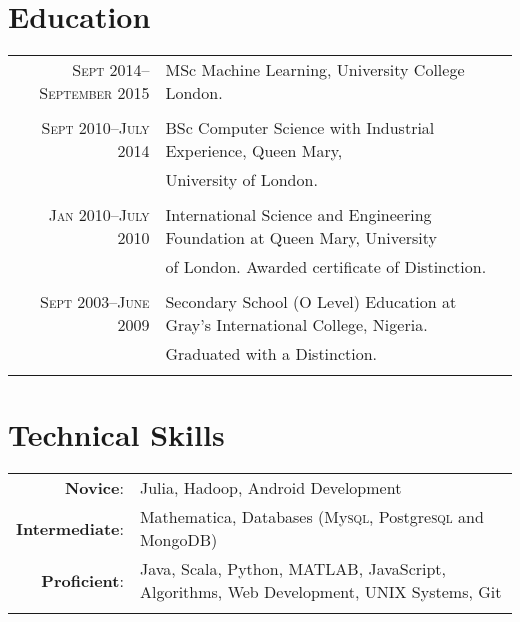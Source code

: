 \documentclass[a4paper,10pt]{article}
\begin{document}
\section{Education}
\begin{tabular}{rl}
  \textsc{Sept} 2014--\textsc{September} 2015 & MSc Machine Learning, University College London.\\&\\

  \textsc{Sept} 2010--\textsc{July} 2014 & BSc Computer Science with Industrial Experience, Queen
  Mary,\\& University of London.\\&\\

  \textsc{Jan} 2010--\textsc{July} 2010 & International Science and Engineering Foundation at
  Queen Mary, University\\& of London. Awarded certificate of Distinction.\\&\\

  \textsc{Sept} 2003--\textsc{June} 2009 & Secondary School (O Level) Education at Gray’s
  International College, Nigeria.\\& Graduated with a Distinction.\\\\
\end{tabular}

\section{Technical Skills}
\begin{tabular}{rl}
  \textbf{Novice}:       & Julia, Hadoop, Android Development\\
  \textbf{Intermediate}: & Mathematica, Databases (My\textsc{sql}, Postgre\textsc{sql} and MongoDB)\\
  \textbf{Proficient}:   & Java, Scala, Python, MATLAB, JavaScript, Algorithms, Web Development, UNIX Systems, Git\\\\
\end{tabular}
\end{document}

